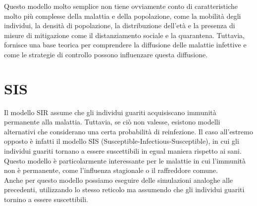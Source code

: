 \documentclass{article}
\begin{document}
    Questo modello molto semplice non tiene ovviamente conto di caratteristiche molto più complesse della malattia e della
    popolazione, come la mobilità degli individui, la densità di popolazione, la distribuzione dell'età e la presenza di
    misure di mitigazione come il distanziamento sociale e la quarantena. Tuttavia, fornisce una base teorica per
    comprendere la diffusione delle malattie infettive e come le strategie di controllo possono influenzare questa diffusione.

    \section{SIS}
    Il modello SIR assume che gli individui guariti acquisiscano immunità permanente alla malattia.
    Tuttavia, se ciò non valesse, esistono modelli alternativi che considerano una certa probabilità di reinfezione.
    Il caso all'estremo opposto è infatti il modello SIS (Susceptible-Infectious-Susceptible), in cui gli individui
    guariti tornano a essere suscettibili in egual maniera rispetto ai sani.
    Questo modello è particolarmente interessante per le malattie in cui l'immunità non è permanente, come l'influenza
    stagionale o il raffreddore comune.\\
    Anche per questo modello possiamo eseguire delle simulazioni analoghe alle precedenti, utilizzando lo stesso reticolo ma
    assumendo che gli individui guariti tornino a essere suscettibili.
\end{document}
